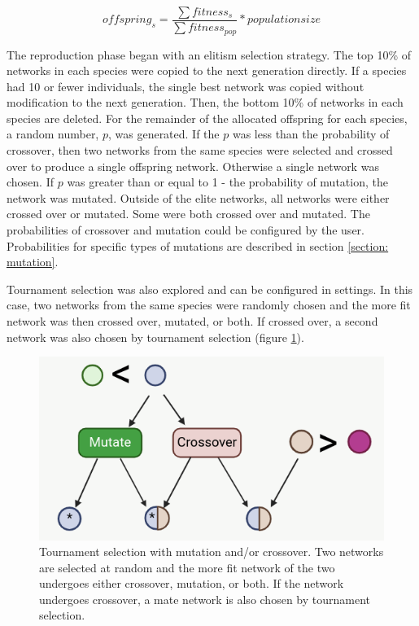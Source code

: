 \documentclass[12pt]{report}
\begin{document}
\begin{equation}
\label{equation: num_offspring}
offspring_{s} = \frac{\sum{fitness_{s}}}{\sum{fitness_{pop}}}*populationsize
\end{equation} 


The reproduction phase began with an elitism selection strategy. The top 10\% of networks in each species were copied to the next generation directly. If a species had 10 or fewer individuals, the single best network was copied without modification to the next generation. Then, the bottom 10\% of networks in each species are deleted. For the remainder of the allocated offspring for each species, a random number, $p$, was generated. If the $p$ was less than the probability of crossover, then two networks from the same species were selected and crossed over to produce a single offspring network. Otherwise a single network was chosen. If $p$ was greater than or equal to 1 - the probability of mutation, the network was mutated. Outside of the elite networks, all networks were either crossed over or mutated. Some were both crossed over and mutated. The probabilities of crossover and mutation could be configured by the user. Probabilities for specific types of mutations are described in section \ref{section: mutation}.

Tournament selection was also explored and can be configured in settings. In this case, two networks from the same species were randomly chosen and the more fit network was then crossed over, mutated, or both. If crossed over, a second network was also chosen by tournament selection (figure \ref{fig:tournament_crossover_diagram}).

\begin{figure}
\centering
    \includegraphics[width=12cm]{images/tournament_crossover_diagram.png}
    \caption[Tournament selection with mutation and/or crossover]{Tournament selection with mutation and/or crossover. Two networks are selected at random and the more fit network of the two undergoes either crossover, mutation, or both. If the network undergoes crossover, a mate network is also chosen by tournament selection.}
    \label{fig:tournament_crossover_diagram}
\end{figure}
\end{document}
